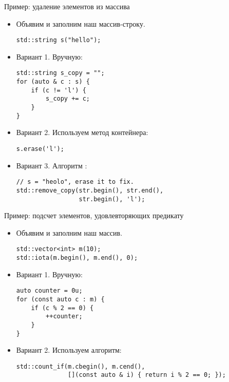 \documentclass{beamer}
\begin{document}
\begin{frame}[fragile]{Пример: удаление элементов из массива}
    \begin{itemize}
        \item Объявим и заполним наш массив-строку.
            \begin{lstlisting}
std::string s("hello");
            \end{lstlisting}
        \item Вариант 1. Вручную:
            \begin{lstlisting}
std::string s_copy = "";
for (auto & c : s) {
    if (c != 'l') {
        s_copy += c;
    }
}
            \end{lstlisting}
        \item Вариант 2. Используем метод контейнера:
            \begin{lstlisting}
s.erase('l');
            \end{lstlisting}
        \item Вариант 3. Алгоритм :
            \begin{lstlisting}
// s = "heolo", erase it to fix.
std::remove_copy(str.begin(), str.end(),
                 str.begin(), 'l');
            \end{lstlisting}
    \end{itemize}
\end{frame}

\begin{frame}[fragile]{Пример: подсчет элементов, удовлевторяющих предикату}
    \begin{itemize}
        \item Объявим и заполним наш массив.
            \begin{lstlisting}
std::vector<int> m(10);
std::iota(m.begin(), m.end(), 0);
            \end{lstlisting}
        \item Вариант 1. Вручную:
            \begin{lstlisting}
auto counter = 0u;
for (const auto c : m) {
    if (c % 2 == 0) {
        ++counter;
    }
}
            \end{lstlisting}
        \item Вариант 2. Используем алгоритм:
            \begin{lstlisting}
std::count_if(m.cbegin(), m.cend(),
              [](const auto & i) { return i % 2 == 0; });
            \end{lstlisting}
    \end{itemize}
\end{frame}
\end{document}
